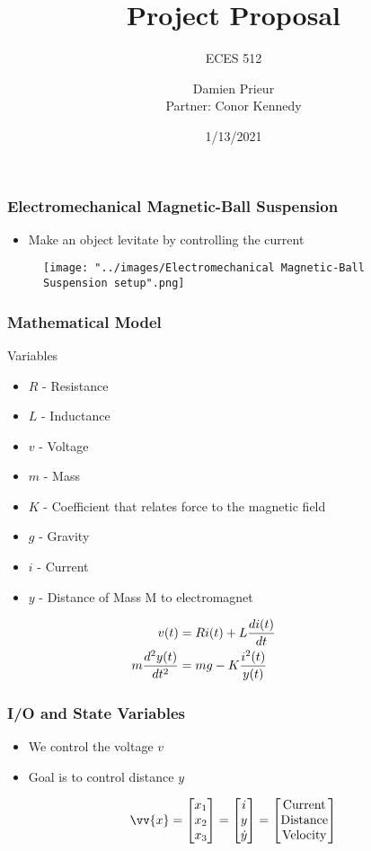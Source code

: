 \documentclass{beamer}
\title{Project Proposal}
\subtitle{ECES 512}
\author{Damien Prieur \\ Partner: Conor Kennedy}
\date{1/13/2021}
\begin{document}
\frame{\titlepage}

\begin{frame}
\frametitle{Electromechanical Magnetic-Ball Suspension}
\begin{itemize}[$\bullet$]
\item Make an object levitate by controlling the current
\end{itemize}
\begin{figure}
\texttt{[image: "../images/Electromechanical Magnetic-Ball Suspension setup".png]}
\end{figure}
\end{frame}

\begin{frame}
\frametitle{Mathematical Model}
Variables
\begin{itemize}
\item $R$ - Resistance
\item $L$ - Inductance
\item $v$ - Voltage
\item $m$ - Mass
\item $K$ - Coefficient that relates force to the magnetic field
\item $g$ - Gravity
\item $i$ - Current
\item $y$ - Distance of Mass M to electromagnet
\end{itemize}
$$
\begin{aligned}
    &\begin{aligned}
        \mathllap{v(t)} &= Ri(t) + L\frac{di(t)}{dt}
    \end{aligned} \\
    &\begin{aligned}
        \mathllap{m\frac{d^2y(t)}{dt^2}} &= mg - K\frac{i^2(t)}{y(t)}
    \end{aligned} \\
\end{aligned}
$$
\end{frame}

\begin{frame}
\frametitle{I/O and State Variables}
\begin{itemize}[$\bullet$]
\item We control the voltage $v$
\item Goal is to control distance $y$
\end{itemize}
$$
\vv{x}=
\begin{bmatrix}
x_1 \\
x_2 \\
x_3
\end{bmatrix}
=
\begin{bmatrix}
i \\
y \\
\dot{y}
\end{bmatrix}
=
\begin{bmatrix}
\text{Current} \\
\text{Distance}\\
\text{Velocity}
\end{bmatrix}
$$

\end{frame}
\end{document}
